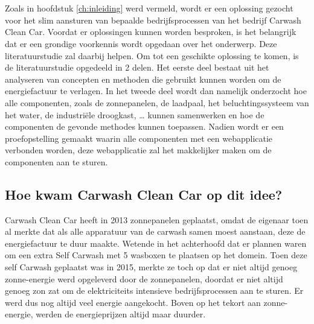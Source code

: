 \chapter{}%
\label{ch:stand-van-zaken}



Zoals in hoofdstuk \ref{ch:inleiding} werd vermeld, wordt er een oplossing gezocht voor het slim aansturen van bepaalde bedrijfsprocessen van het bedrijf Carwash Clean Car. Voordat er oplossingen kunnen worden besproken, is het belangrijk dat er een grondige voorkennis wordt opgedaan over het onderwerp. Deze literatuurstudie zal daarbij helpen. Om tot een geschikte oplossing te komen, is de literatuurstudie opgedeeld in 2 delen. Het eerste deel bestaat uit het analyseren van concepten en methoden die gebruikt kunnen worden om de energiefactuur te verlagen. In het tweede deel wordt dan namelijk onderzocht hoe alle componenten, zoals de zonnepanelen, de laadpaal, het beluchtingssysteem van het water, de industriële droogkast, … kunnen samenwerken en hoe de componenten de gevonde methodes kunnen toepassen. Nadien wordt er een proefopstelling gemaakt waarin alle componenten met een webapplicatie verbonden worden, deze webapplicatie zal het makkelijker maken om de componenten aan te sturen.

\section{Hoe kwam Carwash Clean Car op dit idee?}
\label{sec:stand-van-zaken-idee}

Carwash Clean Car heeft in 2013 zonnepanelen geplaatst, omdat de eigenaar toen al merkte dat als alle apparatuur van de carwash samen moest aanstaan, deze de energiefactuur te duur maakte. Wetende in het achterhoofd dat er plannen waren om een extra Self Carwash met 5 wasboxen te plaatsen op het domein. Toen deze self Carwash geplaatst was in 2015, merkte ze toch op dat er niet altijd genoeg zonne-energie werd opgeleverd door de zonnepanelen, doordat er niet altijd genoeg zon zat om de elektriciteits intensieve bedrijfsprocessen aan te sturen. Er werd dus nog altijd veel energie aangekocht. Boven op het tekort aan zonne-energie, werden de energieprijzen altijd maar duurder.


